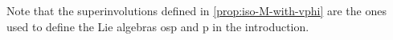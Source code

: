 \begin{remark}
    Note that the superinvolutions defined in \cref{prop:iso-M-with-vphi} are the ones used to define the Lie algebras osp and p in the introduction.
\end{remark}



